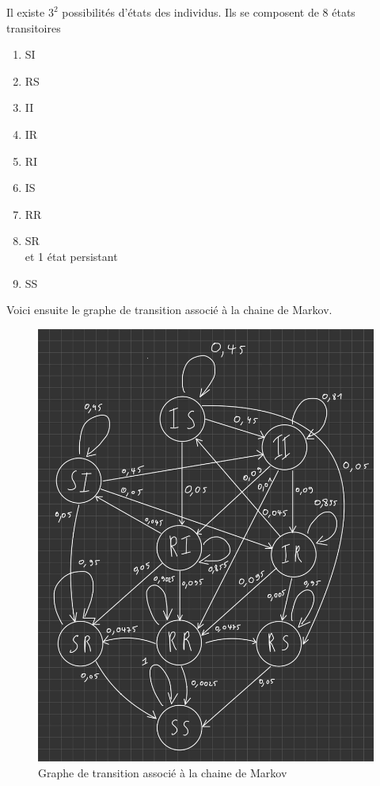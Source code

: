 \documentclass[a4paper, 11pt, oneside]{article}
\begin{document}
Il existe $3^2$ possibilités d'états des individus.
Ils se composent de 8 états transitoires 
\begin{enumerate}
    \item SI
    \item RS 
    \item II 
    \item IR 
    \item RI 
    \item IS 
    \item RR 
    \item SR 
    \\et 1 état persistant
    \item SS
\end{enumerate}
Voici ensuite le graphe de transition associé à la chaine de Markov.
\begin{figure}[h]
    \centering
    \includegraphics[scale=0.55]{graphe_question1.jpg}
    \caption{Graphe de transition associé à la chaine de Markov}
\end{figure}
\end{document}
